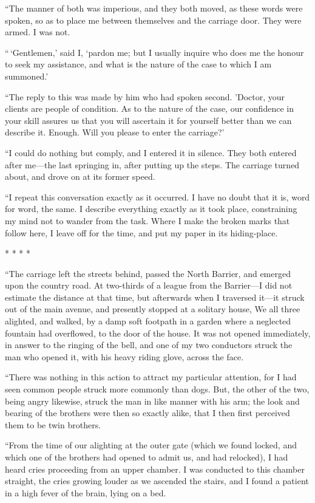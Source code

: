 ``The manner of both was imperious, and they both moved, as these
words were spoken, so as to place me between themselves and the
carriage door.  They were armed.  I was not.

``\,`Gentlemen,' said I, `pardon me; but I usually inquire who does me
the honour to seek my assistance, and what is the nature of the case
to which I am summoned.'

``The reply to this was made by him who had spoken second.
'Doctor, your clients are people of condition.  As to the nature of
the case, our confidence in your skill assures us that you will
ascertain it for yourself better than we can describe it.  Enough.
Will you please to enter the carriage?'

``I could do nothing but comply, and I entered it in silence.  They
both entered after me---the last springing in, after putting up the
steps.  The carriage turned about, and drove on at its former speed.

``I repeat this conversation exactly as it occurred.  I have no doubt
that it is, word for word, the same.  I describe everything exactly
as it took place, constraining my mind not to wander from the task.
Where I make the broken marks that follow here, I leave off for the
time, and put my paper in its hiding-place.

* * * *

``The carriage left the streets behind, passed the North Barrier, and
emerged upon the country road.  At two-thirds of a league from the
Barrier---I did not estimate the distance at that time, but afterwards
when I traversed it---it struck out of the main avenue, and presently
stopped at a solitary house, We all three alighted, and walked, by a
damp soft footpath in a garden where a neglected fountain had
overflowed, to the door of the house.  It was not opened immediately,
in answer to the ringing of the bell, and one of my two conductors
struck the man who opened it, with his heavy riding glove, across the
face.

``There was nothing in this action to attract my particular attention,
for I had seen common people struck more commonly than dogs.
But, the other of the two, being angry likewise, struck the man in
like manner with his arm; the look and bearing of the brothers were
then so exactly alike, that I then first perceived them to be twin
brothers.

``From the time of our alighting at the outer gate (which we found
locked, and which one of the brothers had opened to admit us, and had
relocked), I had heard cries proceeding from an upper chamber.  I was
conducted to this chamber straight, the cries growing louder as we
ascended the stairs, and I found a patient in a high fever of the brain,
lying on a bed.

